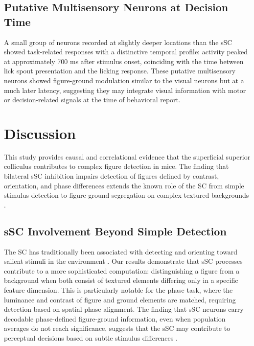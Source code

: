 \documentclass[12pt]{article}
\begin{document}
\subsection{Putative Multisensory Neurons at Decision Time}

A small group of neurons recorded at slightly deeper locations than the sSC showed task-related responses with a distinctive temporal profile: activity peaked at approximately 700 ms after stimulus onset, coinciding with the time between lick spout presentation and the licking response. These putative multisensory neurons showed figure-ground modulation similar to the visual neurons but at a much later latency, suggesting they may integrate visual information with motor or decision-related signals at the time of behavioral report.

\section{Discussion}

This study provides causal and correlational evidence that the superficial superior colliculus contributes to complex figure detection in mice. The finding that bilateral sSC inhibition impairs detection of figures defined by contrast, orientation, and phase differences extends the known role of the SC from simple stimulus detection to figure-ground segregation on complex textured backgrounds \citep{schneider1969sc, dean1989sc, boehnke2011sc}.

\subsection{sSC Involvement Beyond Simple Detection}

The SC has traditionally been associated with detecting and orienting toward salient stimuli in the environment \citep{schneider1969sc}. Our results demonstrate that sSC processes contribute to a more sophisticated computation: distinguishing a figure from a background when both consist of textured elements differing only in a specific feature dimension. This is particularly notable for the phase task, where the luminance and contrast of figure and ground elements are matched, requiring detection based on spatial phase alignment. The finding that sSC neurons carry decodable phase-defined figure-ground information, even when population averages do not reach significance, suggests that the sSC may contribute to perceptual decisions based on subtle stimulus differences \citep{gale2014sc, resulaj2018svm}.
\end{document}
